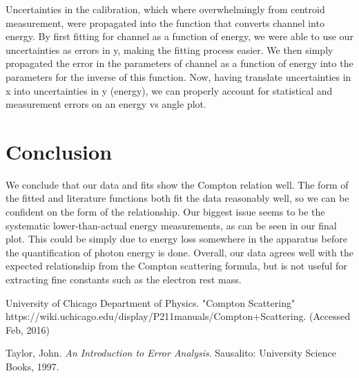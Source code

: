 \documentclass{article}
\begin{document}
\hspace{.25cm}

Uncertainties in the calibration, which where overwhelmingly from centroid measurement, were propagated into the function that converts channel into energy. By first fitting for channel as a function of energy, we were able to use our uncertainties as errors in y, making the fitting process easier. We then simply propagated the error in the parameters of channel as a function of energy into the parameters for the inverse of this function. Now, having translate uncertainties in x into uncertainties in y (energy), we can properly account for statistical and measurement errors on an energy vs angle plot.

\section{Conclusion}

We conclude that our data and fits show the Compton relation well. The form of the fitted and literature functions both fit the data reasonably well, so we can be confident on the form of the relationship. Our biggest issue seems to be the systematic lower-than-actual energy measurements, as can be seen in our final plot. This could be simply due to energy loss somewhere in the apparatus before the quantification of photon energy is done.
Overall, our data agrees well with the expected relationship from the Compton scattering formula, but is not useful for extracting fine constants such as the electron rest mass.


\begin{thebibliography}{10}

		University of Chicago Department of Physics. "Compton Scattering"\\
		https://wiki.uchicago.edu/display/P211manuals/Compton+Scattering. (Accessed Feb, 2016)

		Taylor, John. \emph{An Introduction to Error Analysis}. Sausalito: University Science Books, 1997.
		
\end{thebibliography}
\end{document}
